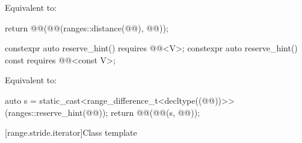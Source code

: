 \begin{itemdescr}
\pnum
\effects
Equivalent to:
\begin{codeblock}
return @@(@@(ranges::distance(@@), @@));
\end{codeblock}
\end{itemdescr}

%
\begin{itemdecl}
constexpr auto reserve_hint() requires @@<V>;
constexpr auto reserve_hint() const requires @@<const V>;
\end{itemdecl}

\begin{itemdescr}
\pnum
\effects
Equivalent to:
\begin{codeblock}
auto s = static_cast<range_difference_t<decltype((@@))>>(ranges::reserve_hint(@@));
return @@(@@(s, @@));
\end{codeblock}
\end{itemdescr}

[range.stride.iterator]{Class template }

